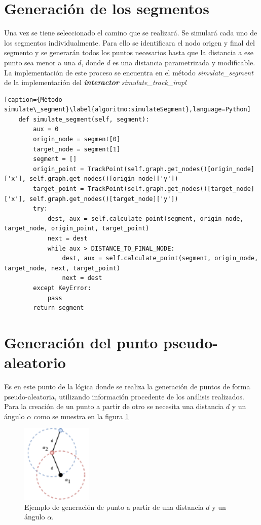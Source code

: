 \section{Generación de los segmentos}

Una vez se tiene seleccionado el camino que se realizará. Se simulará cada uno de los segmentos individualmente.
Para ello se identificara el nodo origen y final del segmento y se generarán todos los puntos necesarios hasta
que la distancia a ese punto sea menor a una $d$, donde $d$ es una distancia parametrizada y modificable. 
La implementación de este proceso se encuentra en el método \textit{simulate\_segment} de la implementación 
del \textbf{\textit{interactor}} \textit{simulate\_track\_impl}

\begin{lstlisting}[caption={Método simulate\_segment}\label{algoritmo:simulateSegment},language=Python] 
    def simulate_segment(self, segment):
        aux = 0
        origin_node = segment[0]
        target_node = segment[1]
        segment = []
        origin_point = TrackPoint(self.graph.get_nodes()[origin_node]['x'], self.graph.get_nodes()[origin_node]['y'])
        target_point = TrackPoint(self.graph.get_nodes()[target_node]['x'], self.graph.get_nodes()[target_node]['y'])
        try:
            dest, aux = self.calculate_point(segment, origin_node, target_node, origin_point, target_point)
            next = dest
            while aux > DISTANCE_TO_FINAL_NODE:
                dest, aux = self.calculate_point(segment, origin_node, target_node, next, target_point)
                next = dest
        except KeyError:
            pass
        return segment
\end{lstlisting}

\newpage
\section{Generación del punto pseudo-aleatorio}

Es en este punto de la lógica donde se realiza la generación de puntos de forma pseudo-aleatoria, 
utilizando información procedente de los análisis realizados.
Para la creación de un punto a partir de otro se necesita una distancia $d$ y un ángulo $\alpha$ como 
se muestra en la figura \ref{fig:PointGeneration01}
\begin{figure}[htb]
\begin{center}
\includegraphics[scale=0.75, width=0.3\textwidth]{./Imagenes/PointGeneration01.png}
\caption{Ejemplo de generación de punto a partir de una distancia $d$ y un ángulo $\alpha$.}
\label{fig:PointGeneration01}
\end{center}
\end{figure}

